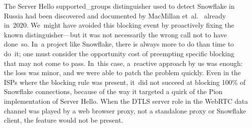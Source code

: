\documentclass[letterpaper,twocolumn]{article}
\begin{document}
The Server Hello \mbox{supported\_groups} distinguisher
used to detect Snowflake in Russia had been
discovered and documented by MacMillan et~al.~\cite[\S 3]{arxiv.2008.03254}
already in~2020.
We~might have avoided this blocking event by proactively fixing
the known distinguisher---but
it was not necessarily the wrong call not to have done~so.
In~a project like Snowflake,
there is always more to do than time to do~it;
one must consider the opportunity cost
of preempting specific blocking that may not come to pass.
In~this case, a~reactive approach by us was enough:
the loss was minor, and we were able to patch the problem quickly.
Even in the ISPs where the blocking rule was present,
it~did not succeed
at blocking 100\% of Snowflake connections,
because of the way it targeted a quirk of the Pion
implementation of Server Hello.
When the DTLS server role in the WebRTC data channel
was played by a web browser proxy,
not a standalone proxy or Snowflake client,
the feature would not be present.

\end{document}
